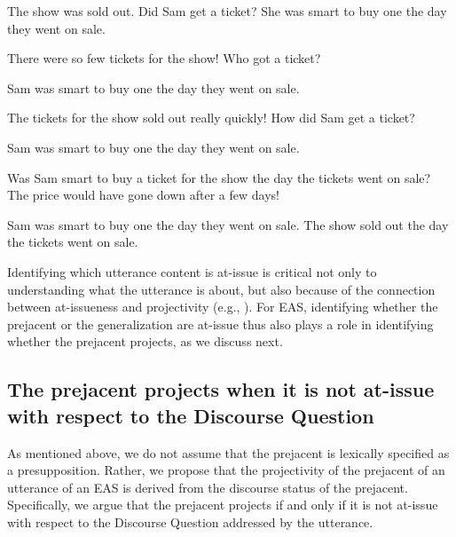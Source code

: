 \documentclass[11pt,fleqn]{article}
\newcommand{\6}{\mbox{$[\hspace*{-.6mm}[$}}
\newcommand{\9}{\mbox{$]\hspace*{-.6mm}]$}}
\begin{document}
\begin{exe}
\ex\label{ai}

\begin{xlist}
\ex
\begin{xlist}
 The show was sold out. Did Sam get a ticket?
 She was smart to buy one the day they went on sale.
\end{xlist}

\ex
\begin{xlist}
 There were so few tickets for the show! Who got a ticket?

 Sam was smart to buy one the day they went on sale. 

\end{xlist}

\ex
\begin{xlist}
 The tickets for the show sold out really quickly! How did Sam get a ticket?

 Sam was smart to buy one the day they went on sale.

\end{xlist}

\ex
\begin{xlist}
 Was Sam smart to buy a ticket for the show the day the tickets went on sale? The price would have gone down after a few days!

 Sam was smart to buy one the day they went on sale. The show sold out the day the tickets went on sale.

\end{xlist}

\end{xlist}
\end{exe}

Identifying which utterance content is at-issue is critical not only to understanding what the utterance is about, but also because of the connection between at-issueness and projectivity (e.g., \citealt{potts05,brst-salt10,best-question,brst-ar}). For EAS, identifying whether the prejacent or the generalization are at-issue thus also plays a role in identifying whether the prejacent projects, as we discuss next.

\subsection{The prejacent projects when it is not at-issue with respect to the Discourse Question}

As mentioned above, we do not assume that the prejacent is lexically specified as a presupposition. Rather, we propose that the projectivity of the prejacent of an utterance of an EAS is derived from the discourse status of the prejacent. Specifically, we argue that the prejacent projects if and only if it is not at-issue with respect to the Discourse Question addressed by the utterance. 
\end{document}
